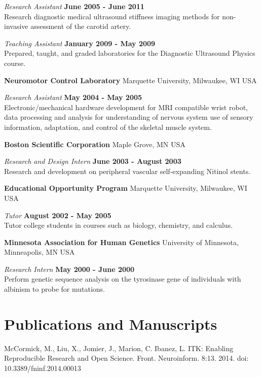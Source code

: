 \documentclass[margin,line]{res}
\begin{document}
\begin{resume}
\vspace{-.3cm}
{\em Research Assistant} \hfill {\bf June 2005 - June 2011} \\
Research diagnostic medical ultrasound stiffness imaging methods for non-invasive assessment of the carotid artery.

\vspace{-.3cm}
{\em Teaching Assistant} \hfill {\bf January 2009 - May 2009} \\
Prepared, taught, and graded laboratories for the Diagnostic Ultrasound Physics
course.

{\bf Neuromotor Control Laboratory} Marquette University, Milwaukee, WI USA

\vspace{-.3cm}
{\em Research Assistant} \hfill {\bf May 2004 - May 2005} \\
Electronic/mechanical hardware development for MRI compatible wrist robot, data processing and analysis for understanding of nervous system use of sensory information,  adaptation,  and control of the skeletal muscle system.

{\bf Boston Scientific Corporation} Maple Grove, MN USA

\vspace{-.3cm}
{\em Research and Design Intern} \hfill {\bf June 2003 - August 2003} \\
Research and development on peripheral vascular self-expanding Nitinol stents.

{\bf Educational Opportunity Program} Marquette University, Milwaukee, WI USA

\vspace{-.3cm}
{\em Tutor} \hfill {\bf August 2002 - May 2005} \\
Tutor college students in courses such as biology, chemistry, and calculus.

{\bf Minnesota Association for Human Genetics} University of Minnesota, Minneapolis, MN USA

\vspace{-.3cm}
{\em Research Intern} \hfill {\bf May 2000 - June 2000} \\
Perform genetic sequence analysis on the tyrosinase gene of individuals with albinism to probe for mutations.

\section{\sc Publications and Manuscripts}

McCormick, M., Liu, X., Jomier, J., Marion, C. Ibanez, L. ITK: Enabling
Reproducible Research and Open Science.  Front. Neuroinform. 8:13. 2014. doi:
10.3389/fninf.2014.00013


\end{resume}
\end{document}
